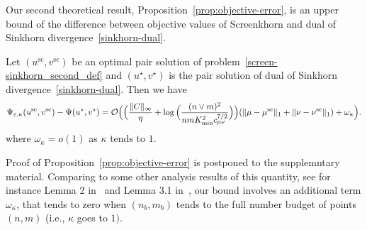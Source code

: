 Our second theoretical result, Proposition~\ref{prop:objective-error}, is an upper bound of the difference between objective values of Screenkhorn and dual of Sinkhorn divergence~\eqref{sinkhorn-dual}. 
\begin{proposition}
\label{prop:objective-error}
Let $(u^{\text{sc}}, v^{\text{sc}})$ be an optimal pair solution of problem~\eqref{screen-sinkhorn_second_def} and $(u^\star, v^\star)$ is the pair solution of dual of Sinkhorn divergence~\eqref{sinkhorn-dual}. Then we have 
\begin{align*}
\Psi_{\varepsilon, \kappa}(u^{\text{sc}} ,v^{\text{sc}}) -\Psi(u^\star, v^\star)
= \mathcal{O}\Big(\Big(\frac{\|C\|_\infty}{\eta} + \log\Big(\frac{(n\vee m)^2}{nmK_{\min}^{2}c_{\mu\nu}^{7/2}}\Big)\Big)(\|\mu - \mu^{\text{sc}}\|_1 + \|\nu - \nu^{\text{sc}}\|_1)  + \omega_{\kappa}\Big).
\end{align*}
where $\omega_{\kappa} = o(1)$  as $\kappa$ tends to $1.$
\end{proposition}
Proof of Proposition~\ref{prop:objective-error} is postponed to the supplemntary material.
Comparing to some other analysis results of this quantity, see for instance Lemma 2 in~\cite{dvurechensky18aICML} and Lemma 3.1 in~\cite{lin2019}, our bound involves an additional term $\omega_{\kappa}$, that tends to zero when $(n_b,m_b)$ tends to the full number budget of points $(n,m)$ (i.e., $\kappa$ goes to $1).$
